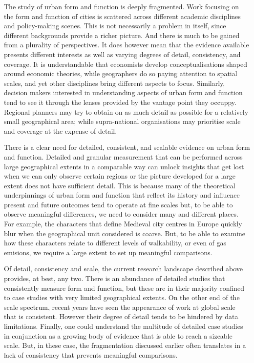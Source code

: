 The study of urban form and function is deeply fragmented.
Work focusing on the form and function of cities is scattered across
different academic disciplines and policy-making scenes. This is not
necessarily a problem in itself, since different backgrounds
provide a richer picture. And there is much to be gained from a plurality of
perspectives.
%
It does however mean that the evidence available presents different 
interests as well as varying degrees of detail, consistency, and coverage.
It is understandable that economists develop conceptualisations shaped around
economic theories, while geographers do so paying attention to spatial scales,
and yet other disciplines bring different aspects to focus.
Similarly, decision makers interested in understanding aspects of urban form
and function tend to see it through the lenses provided by the vantage point
they occuppy. Regional planners may try to obtain on as much detail as
possible for a relatively small geographical area; while supra-national
organisations may prioritise scale and coverage at the expense of detail.

There is a clear need for detailed, consistent, and scalable evidence on urban
form and function.
Detailed and granular measurement that can be performed across large
geographical extents in a comparable way can unlock insights that get lost
when we can only observe certain regions or the picture developed for a large
extent does not have sufficient detail. 
%
This is because many of the
theoretical underpinnings of urban form and function that reflect its history
and influence present and future outcomes tend to operate at fine scales but,
to be able to observe meaningful differences, we need to consider many and
different places.
%
For example, the characters that define Medieval city centres in Europe
quickly blur when the geographical unit considered is coarse. But, to be able to
examine how these characters relate to different levels of walkability, or
even of gas emisions, we require a large extent to set up meaningful
comparisons.

Of detail, consistency and scale, the current research landscape described above
provides, at best, any two.
%
There is an abundance of detailed studies that consistently measure form and
function, but these are in their majority confined to case studies with very
limited geographical extents.
%
On the other end of the scale spectrum, recent years have seen the appearance
of work at global scale that is consistent. However their degree of detail
tends to be hindered by data limitations.
%
Finally, one could understand the multitude of detailed case studies in
conjunction as a growing body of evidence that is able to reach a sizeable
scale. But, in these case, the fragmentation discussed earlier often
translates in a lack of consistency that prevents meaningful comparisons.

